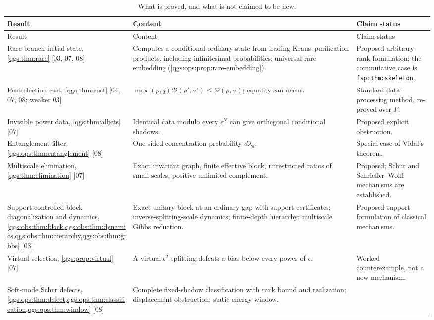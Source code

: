\documentclass[11pt,oneside]{article}
\numberwithin{equation}{section}
\theoremstyle{plain}
\theoremstyle{definition}
\theoremstyle{remark}
\newcommand{\TD}{\mathcal D}
\newcommand{\src}[1]{{\small\textsf{[#1]}}}
\begin{document}
\begin{longtable}{@{}L{0.24\textwidth}L{0.41\textwidth}L{0.24\textwidth}@{}}
\caption{What is proved, and what is not claimed to be new.}\label{qgs:tab:contributions}\\
\toprule
Result & Content & Claim status\\
\midrule
\endfirsthead
\toprule
Result & Content & Claim status\\
\midrule
\endhead
\bottomrule
\endfoot
Rare-branch initial state, \cref{qgs:thm:rare} \src{03, 07, 08}
& Computes a conditional ordinary state from leading Kraus--purification products, including infinitesimal probabilities; universal rare embedding (\cref{qgs:ops:prop:rare-embedding}).
& Proposed arbitrary-rank formulation; the commutative case is \texttt{fsp:thm:skeleton}.\\[3pt]
Postselection cost, \cref{qgs:thm:cost} \src{04, 07, 08; weaker 03}
& $\max(p,q)\TD(\rho',\sigma')\le\TD(\rho,\sigma)$; equality can occur.
& Standard data-processing method, re-proved over $F$.\\[3pt]
Invisible power data, \cref{qgs:thm:alljets} \src{07}
& Identical data modulo every $\epsilon^N$ can give orthogonal conditional shadows.
& Proposed explicit obstruction.\\[3pt]
Entanglement filter, \cref{qgs:ops:thm:entanglement} \src{08}
& One-sided concentration probability $d\lambda_d$.
& Special case of Vidal's theorem.\\[3pt]
Multiscale elimination, \cref{qgs:thm:elimination} \src{07}
& Exact invariant graph, finite effective block, unrestricted ratios of small scales, positive unlimited complement.
& Proposed; Schur and Schrieffer--Wolff mechanisms are established.\\[3pt]
Support-controlled block diagonalization and dynamics, \cref{qgs:obs:thm:block,qgs:obs:thm:dynamics,qgs:obs:thm:hierarchy,qgs:obs:thm:gibbs} \src{03}
& Exact unitary block at an ordinary gap with support certificates; inverse-splitting-scale dynamics; finite-depth hierarchy; multiscale Gibbs reduction.
& Proposed support formulation of classical mechanisms.\\[3pt]
Virtual selection, \cref{qgs:prop:virtual} \src{07}
& A virtual $\epsilon^2$ splitting defeats a bias below every power of $\epsilon$.
& Worked counterexample, not a new mechanism.\\[3pt]
Soft-mode Schur defects, \cref{qgs:ops:thm:defect,qgs:ops:thm:classification,qgs:ops:thm:window} \src{08}
& Complete fixed-shadow classification with rank bound and realization; displacement obstruction; static energy window.

\end{longtable}
\end{document}
